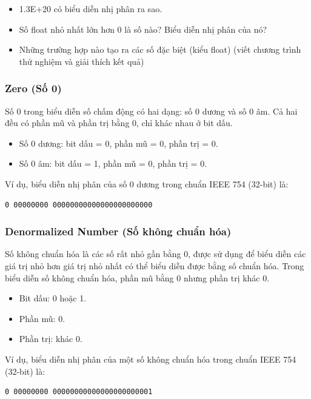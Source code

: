 \begin{itemize}
	\item 1.3E+20 có biểu diễn nhị phân ra sao.
	\item Số float nhỏ nhất lớn hơn 0 là số nào? Biểu diễn nhị phân của nó?
	\item Những trường hợp nào tạo ra các số đặc biệt (kiểu float) (viết chương trình thử nghiệm và giải thích kết quả)
\end{itemize}

\subsubsection{Zero (Số 0)}

Số 0 trong biểu diễn số chấm động có hai dạng: số 0 dương và số 0 âm. Cả hai đều có phần mũ và phần trị bằng 0, chỉ khác nhau ở bit dấu.


\begin{itemize}
	\item Số 0 dương: bit dấu = 0, phần mũ = 0, phần trị = 0.
	\item Số 0 âm: bit dấu = 1, phần mũ = 0, phần trị = 0.
\end{itemize}

Ví dụ, biểu diễn nhị phân của số 0 dương trong chuẩn IEEE 754 (32-bit) là:
\begin{verbatim}
0 00000000 00000000000000000000000
\end{verbatim}

\subsubsection{Denormalized Number (Số không chuẩn hóa)}

Số không chuẩn hóa là các số rất nhỏ gần bằng 0, được sử dụng để biểu diễn các giá trị nhỏ hơn giá trị nhỏ nhất có thể biểu diễn được bằng số chuẩn hóa. Trong biểu diễn số không chuẩn hóa, phần mũ bằng 0 nhưng phần trị khác 0.

\begin{itemize}
	\item Bit dấu: 0 hoặc 1.
	\item Phần mũ: 0.
	\item Phần trị: khác 0.
\end{itemize}

Ví dụ, biểu diễn nhị phân của một số không chuẩn hóa trong chuẩn IEEE 754 (32-bit) là:
\begin{verbatim}
0 00000000 00000000000000000000001
\end{verbatim}

